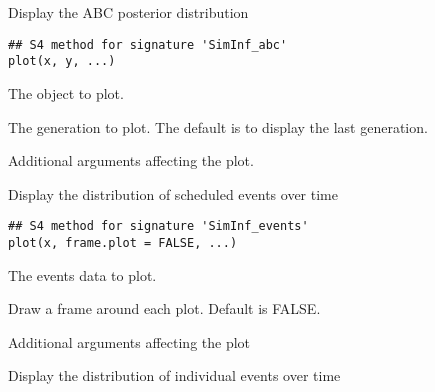 \documentclass[letterpaper]{book}
\begin{document}
%
\begin{Description}
Display the ABC posterior distribution
\end{Description}
%
\begin{Usage}
\begin{verbatim}
## S4 method for signature 'SimInf_abc'
plot(x, y, ...)
\end{verbatim}
\end{Usage}
%
\begin{Arguments}
\begin{ldescription}
\item[\code{x}] The  object to plot.

\item[\code{y}] The generation to plot. The default is to display the
last generation.

\item[\code{...}] Additional arguments affecting the plot.
\end{ldescription}
\end{Arguments}
%
\begin{Description}
Display the distribution of scheduled events over time
\end{Description}
%
\begin{Usage}
\begin{verbatim}
## S4 method for signature 'SimInf_events'
plot(x, frame.plot = FALSE, ...)
\end{verbatim}
\end{Usage}
%
\begin{Arguments}
\begin{ldescription}
\item[\code{x}] The events data to plot.

\item[\code{frame.plot}] Draw a frame around each plot. Default is FALSE.

\item[\code{...}] Additional arguments affecting the plot
\end{ldescription}
\end{Arguments}
%
\begin{Description}
Display the distribution of individual events over time
\end{Description}
\end{document}
